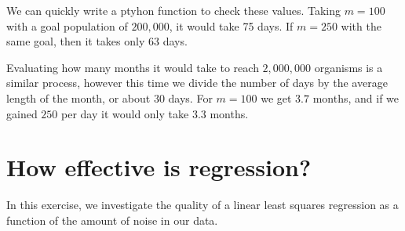 \documentclass[11pt]{article}
\begin{document}
\begin{enumerate}
            We can quickly write a ptyhon function to check these values.
            Taking $m = 100$ with a goal population of $200,000$, it would take
            75 days. If $m=250$ with the same goal, then it takes only $63$
            days. 

            Evaluating how many months it would take to reach $2,000,000$
            organisms is a similar process, however this time we divide the
            number of days by the average length of the month, or about $30$
            days. For $m = 100$ we get $3.7$ months, and if we gained $250$ per
            day it would only take $3.3$ months.
    \end{enumerate}

    \section{How effective is regression?}

    In this exercise, we investigate the quality of a linear least squares
    regression as a function of the amount of noise in our data.
\end{document}
